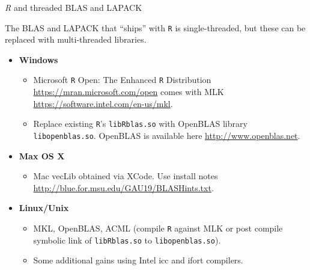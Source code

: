 \documentclass[10pt, xcolor=table]{beamer}
\begin{document}
\begin{frame}
\begin{center}
\emph{R} and threaded BLAS and LAPACK
\end{center}

The BLAS and LAPACK that ``ships'' with \texttt{R} is single-threaded, but these can be replaced with multi-threaded libraries.

\begin{itemize}\setlength{\itemsep}{0.4cm}
\item[]\textbf{Windows}
  \begin{itemize}\setlength{\itemsep}{0.4cm}
  \item Microsoft \texttt{R} Open: The Enhanced \texttt{R} Distribution \url{https://mran.microsoft.com/open} comes with MLK \url{https://software.intel.com/en-us/mkl}.
  \item Replace existing \texttt{R}'s \texttt{libRblas.so} with OpenBLAS library \texttt{libopenblas.so}. OpenBLAS is available here \url{http://www.openblas.net}.
  \end{itemize}
\item[]\textbf{Max OS X}
  \begin{itemize}
  \item Mac vecLib obtained via XCode. Use install notes \url{http://blue.for.msu.edu/GAU19/BLASHints.txt}. 
  \end{itemize}
\item[]\textbf{Linux/Unix}
  \begin{itemize}\setlength{\itemsep}{0.4cm}
  \item MKL, OpenBLAS, ACML (compile \texttt{R} against MLK or post compile symbolic link of \texttt{libRblas.so} to \texttt{libopenblas.so}).
  \item Some additional gains using Intel icc and ifort compilers.
  \end{itemize}
\end{itemize}
\end{frame}
\end{document}
